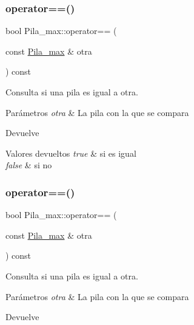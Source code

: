 \subsubsection{\texorpdfstring{operator==()}{operator==()}\hspace{0.1cm}{\footnotesize\ttfamily [1/2]}}
{\footnotesize\ttfamily bool Pila\+\_\+max\+::operator== (\begin{DoxyParamCaption}\item[{const \hyperlink{classPila__max}{Pila\+\_\+max} \&}]{otra }\end{DoxyParamCaption}) const}



Consulta si una pila es igual a otra. 


\begin{DoxyParams}{Parámetros}
{\em otra} & La pila con la que se compara \\
\hline
\end{DoxyParams}
\begin{DoxyReturn}{Devuelve}

\end{DoxyReturn}

\begin{DoxyRetVals}{Valores devueltos}
{\em true} & si es igual \\
\hline
{\em false} & si no \\
\hline
\end{DoxyRetVals}
\mbox{\label{classPila__max_a8806f343ed75ecf695db7a307b6f65ed}} 
\subsubsection{\texorpdfstring{operator==()}{operator==()}\hspace{0.1cm}{\footnotesize\ttfamily [2/2]}}
{\footnotesize\ttfamily bool Pila\+\_\+max\+::operator== (\begin{DoxyParamCaption}\item[{const \hyperlink{classPila__max}{Pila\+\_\+max} \&}]{otra }\end{DoxyParamCaption}) const}



Consulta si una pila es igual a otra. 


\begin{DoxyParams}{Parámetros}
{\em otra} & La pila con la que se compara \\
\hline
\end{DoxyParams}
\begin{DoxyReturn}{Devuelve}

\end{DoxyReturn}


